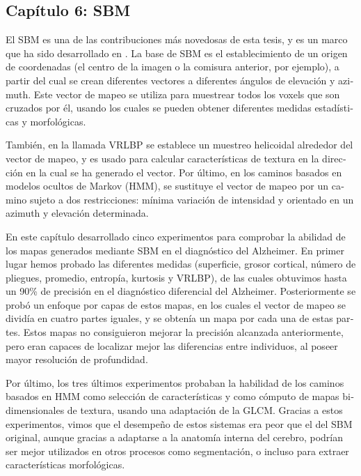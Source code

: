\begin{otherlanguage}{spanish}
\subsection*{Capítulo 6: \acf{SBM}} 
El \acf{SBM} es una de las contribuciones más novedosas de esta tesis, y es un marco que ha sido desarrollado en \cite{Martinez-Murcia2014225,Martinez-Murcia2015,Martinez-MurciaVRLBP,Martinez-Murcia2016}. La base de \ac{SBM} es el establecimiento de un origen de coordenadas (el centro de la imagen o la comisura anterior, por ejemplo), a partir del cual se crean diferentes vectores a diferentes ángulos de elevación y azimuth. Este vector de mapeo se utiliza para muestrear todos los voxels que son cruzados por él, usando los cuales se pueden obtener diferentes medidas estadísticas y morfológicas. 

También, en la llamada \acf{VRLBP} se establece un muestreo helicoidal alrededor del vector de mapeo, y es usado para calcular características de textura en la dirección en la cual se ha generado el vector. Por último, en los caminos basados en modelos ocultos de Markov (\acs{HMM}), se sustituye el vector de mapeo por un camino sujeto a dos restricciones: mínima variación de intensidad y orientado en un azimuth y elevación determinada. 

En este capítulo desarrollado cinco experimentos para comprobar la abilidad de los mapas generados mediante \ac{SBM} en el diagnóstico del Alzheimer. En primer lugar hemos probado las diferentes medidas (superficie, grosor cortical, número de pliegues, promedio, entropía, kurtosis y \ac{VRLBP}), de las cuales obtuvimos hasta un 90\% de precisión en el diagnóstico diferencial del Alzheimer. Posteriormente se probó un enfoque por capas de estos mapas, en los cuales el vector de mapeo se dividía en cuatro partes iguales, y se obtenía un mapa por cada una de estas partes. Estos mapas no consiguieron mejorar la precisión alcanzada anteriormente, pero eran capaces de localizar mejor las diferencias entre individuos, al poseer mayor resolución de profundidad. 

Por último, los tres últimos experimentos probaban la habilidad de los caminos basados en \acs{HMM} como selección de características y como cómputo de mapas bidimensionales de textura, usando una adaptación de la \acs{GLCM}. Gracias a estos experimentos, vimos que el desempeño de estos sistemas era peor que el del \acs{SBM} original, aunque gracias a adaptarse a la anatomía interna del cerebro, podrían ser mejor utilizados en otros procesos como segmentación, o incluso para extraer características morfológicas. 


\end{otherlanguage}
